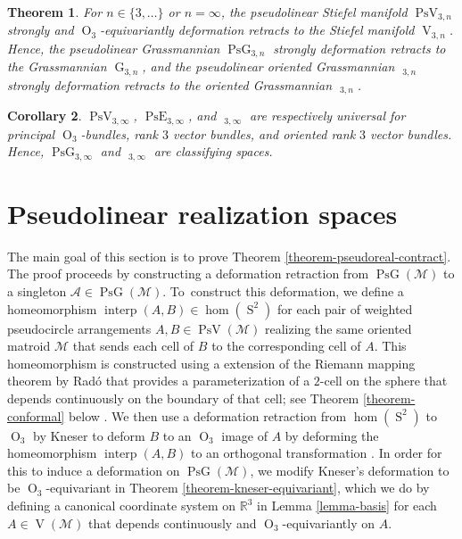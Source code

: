 \documentclass[11pt]{article}
\numberwithin{equation}{section}
\newtheorem{theorem}{Theorem}[subsection]
\newtheorem{corollary}[theorem]{Corollary}
\theoremstyle{remark}
\let\mc\mathcal
\let\mb\mathbb
\DeclareMathOperator{\pg}{PsG}
\DeclareMathOperator{\pog}{Ps\widetilde G}
\DeclareMathOperator{\pe}{PsE}
\DeclareMathOperator{\g}{G}
\DeclareMathOperator{\oG}{\widetilde G}
\DeclareMathOperator{\poe}{Ps\widetilde{E}}
\DeclareMathOperator{\orth}{O}
\DeclareMathOperator{\stief}{V}
\DeclareMathOperator{\pstief}{PsV}
\DeclareMathOperator{\sphere}{S}
\DeclareMathOperator{\interp}{interp}
\begin{document}
\begin{theorem}\label{theorem-grassman-pseudograssman}
For $n \in \{3,\dots\}$ or $n = \infty$,
the pseudolinear Stiefel manifold $\pstief_{3,n}$ strongly and $\orth_3$-equivariantly deformation retracts to the Stiefel manifold $\stief_{3,n}$. Hence, the pseudolinear Grassmannian $\pg_{3,n}$ strongly deformation retracts to the Grassmannian $\g_{3,n}$, and the pseudolinear oriented Grassmannian $\pog_{3,n}$ strongly deformation retracts to the oriented Grassmannian $\oG_{3,n}$.
\end{theorem}

\begin{corollary}\label{corollary-classifying}
$\pstief_{3,\infty}$, $\pe_{3,\infty}$, and $\poe_{3,\infty}$ are respectively universal for principal $\orth_3$-bundles, rank $3$ vector bundles, and oriented rank $3$ vector bundles.
Hence, $\pg_{3,\infty}$ and $\pog_{3,\infty}$ are classifying spaces.
\end{corollary}

\section{Pseudolinear realization spaces}\label{section-contractible}

The main goal of this section is to prove Theorem \ref{theorem-pseudoreal-contract}.
The proof proceeds by constructing a deformation retraction from $\pg(\mc{M})$ to a singleton $\mc{A} \in \pg(\mc{M})$. To~construct this deformation, we define a homeomorphism $\interp(A,B) \in \hom(\sphere^2)$ for each pair of weighted pseudocircle arrangements $A,B \in \pstief(\mc{M})$ realizing the same oriented matroid $\mc{M}$ that sends each cell of $B$ to the corresponding cell of $A$. This homeomorphism is constructed using a extension of the Riemann mapping theorem by Radó that provides a parameterization of a $2$-cell on the sphere that depends continuously on the boundary of that cell; see Theorem \ref{theorem-conformal} below \cite{rado1923representation}. We then use a deformation retraction from $\hom(\sphere^2)$ to $\orth_3$ by Kneser to deform $B$ to an $\orth_3$ image of $A$ by deforming the homeomorphism $\interp(A,B)$ to an orthogonal transformation \cite{kneser1926deformationssatze}. In order for this to induce a deformation on $\pg(\mc{M})$, we modify Kneser's deformation to be $\orth_3$-equivariant in Theorem \ref{theorem-kneser-equivariant}, which we do by defining a canonical coordinate system on $\mb{R}^3$ in Lemma \ref{lemma-basis} for each $A \in \stief(\mc{M})$ that depends continuously and $\orth_3$-equivariantly on $A$.
\end{document}
